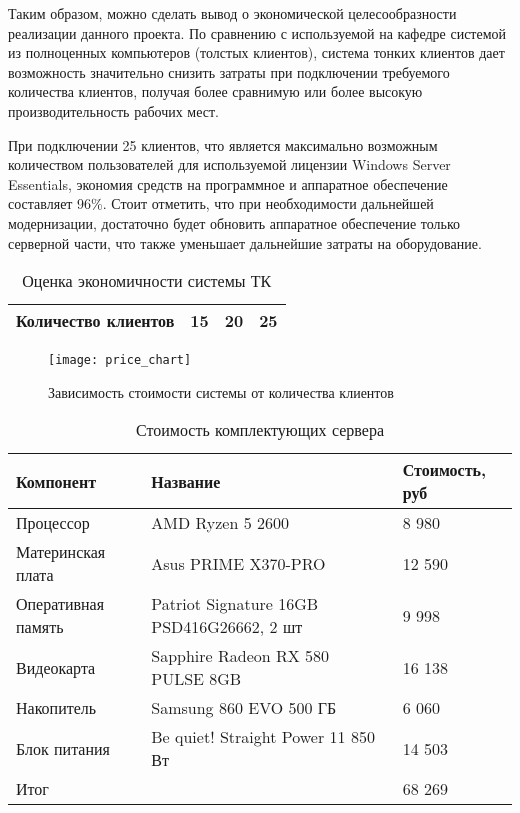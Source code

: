 Таким образом, можно сделать вывод о экономической целесообразности реализации данного
проекта. По сравнению с используемой на кафедре системой из полноценных компьютеров
(толстых клиентов), система тонких клиентов дает возможность значительно снизить затраты
при подключении требуемого количества клиентов, получая более сравнимую или более
высокую производительность рабочих мест. 

При подключении 25 клиентов, что является максимально возможным
количеством пользователей для используемой лицензии Windows Server Essentials, экономия
средств на программное и аппаратное обеспечение составляет 96\%.
Стоит отметить, что при необходимости дальнейшей модернизации, достаточно будет обновить
аппаратное обеспечение только серверной части, что также уменьшает дальнейшие затраты на
оборудование.

\begin{table}[h]
    \centering
    \caption{Оценка экономичности системы ТК}
    \label{tab:price_comp}
    \begin{tabu}to \linewidth{X[3,l]X[c,m]X[c,m]X[c,m]}
        \toprule
        Количество клиентов & 15 & 20 & 25 \\
        \midrule
        
        \bottomrule
    \end{tabu}
\end{table}

\begin{figure}[h]
    \center
    \texttt{[image: price\_chart]}
    \caption{Зависимость стоимости системы от количества клиентов}
    \label{pic:price_chart}
\end{figure}

\begin{table}[b]
    \centering
    \caption{Стоимость комплектующих сервера}
    \label{tab:server_price}
    \begin{tabu}to \linewidth{X[m]X[2.2,c,m]X[r,m]}
        \toprule
        Компонент & Название & Стоимость, руб \\
        \midrule
        Процессор          & AMD Ryzen 5 2600                          & 8 980  \\
        Материнская плата  & Asus PRIME X370-PRO                       & 12 590 \\
        Оперативная память & Patriot Signature 16GB PSD416G26662, 2 шт & 9 998   \\
        Видеокарта         & Sapphire Radeon RX 580 PULSE 8GB          & 16 138  \\
        Накопитель         & Samsung 860 EVO 500 ГБ                    & 6 060  \\
        Блок питания       & Be quiet! Straight Power 11 850 Вт        & 14 503 \\
        \midrule
        Итог & & 68 269 \\
        \bottomrule
    \end{tabu}
\end{table}


